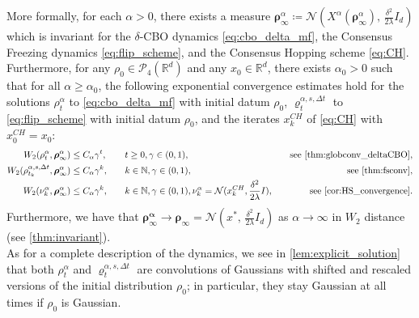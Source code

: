 \documentclass[reqno]{amsart}
\numberwithin{algorithm}{section}
\newcommand{\Xalpha}{{X^\alpha}}
\newcommand{\NN}{{\mathbb N}}
\begin{document}
{More formally, for each $\alpha > 0$, there exists a measure $\boldsymbol\rho_\infty^\alpha \coloneqq \mathcal{N}\!\left(\Xalpha(\boldsymbol\rho_\infty^\alpha),\, \frac{\delta^2}{2\lambda} I_d\right)$ which is invariant for the $\delta$-CBO dynamics \eqref{eq:cbo_delta_mf}, the Consensus Freezing dynamics \eqref{eq:flip_scheme}, and the Consensus Hopping scheme \eqref{eq:CH}. Furthermore, for any $\rho_0 \in \mathcal{P}_4(\mathbb{R}^d)$ and any $x_0 \in \mathbb{R}^d$, there exists $\alpha_0 > 0$ such that for all $\alpha \geq \alpha_0$, the following exponential convergence estimates hold for the solutions $\rho_t^\alpha$ to \eqref{eq:cbo_delta_mf} with initial datum $\rho_0$, $\varrho_t^{\alpha,s,\Delta t}$ to \eqref{eq:flip_scheme} with initial datum $\rho_0$, and the iterates $x_k^{CH}$ of \eqref{eq:CH} with $x_0^{CH}=x_0$:
\begin{alignat*}{3}
    W_2(\rho_t^\alpha, \boldsymbol\rho_\infty^\alpha) &\leq C_\alpha \gamma^t , \quad &&t \geq 0, \gamma \in (0, 1) , \quad &\text{see \cref{thm:globconv_deltaCBO}},\\
    W_2(\rho_{t_k}^{\alpha,s,\Delta t}, \boldsymbol\rho_\infty^\alpha) &\leq C_\alpha \gamma^k, \quad &&k \in \NN, \gamma \in (0, 1), \quad &\text{see \cref{thm:fsconv}},\\
    W_2(\nu_k^\alpha, \boldsymbol\rho_\infty^\alpha) &\leq C_\alpha \gamma^k, \quad &&k \in \NN, \gamma \in (0, 1), \nu_k^\alpha=\mathcal N(x_k^{CH}, \frac{\delta^2}{2\lambda}I), \quad &\text{see \cref{cor:HS_convergence}}. 
\end{alignat*}
Furthermore, we have that $\boldsymbol{\rho_\infty^\alpha} \to \boldsymbol{\rho_\infty} = \mathcal{N}\!\left(x^*,\, \frac{\delta^2}{2\lambda} I_d\right)$ as $\alpha \to \infty$ in $W_2$ distance (see \cref{thm:invariant}). \\
As for a complete description of the dynamics, we see in \cref{lem:explicit_solution} that both $\rho_t^\alpha$ and $\varrho_t^{\alpha,s,\Delta t}$ are convolutions of Gaussians with shifted and rescaled versions of the initial distribution $\rho_0$; in particular, they stay Gaussian at all times if $\rho_0$ is Gaussian.
}
\end{document}
